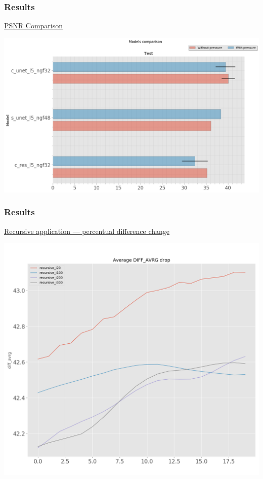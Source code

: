 \documentclass[18pt]{beamer}
\begin{document}
\begin{frame}[t]
  \frametitle{Results}
  \vspace{-0.5cm}
  \begin{center}
    \large{\underline{PSNR Comparison}}
  \end{center}
  \begin{center}
    \includegraphics[scale=0.3]{images/psnr_comp}
  \end{center}
\end{frame}


\begin{frame}[t]
  \frametitle{Results}
  \vspace{-0.5cm}
  \begin{center}
    \large{\underline{Recursive application --- percentual difference change }}
  \end{center}
  \vspace{-0.3cm}
  \begin{center}
    \includegraphics[scale=0.29]{images/avrg_rec}
  \end{center}
\end{frame}
\end{document}
